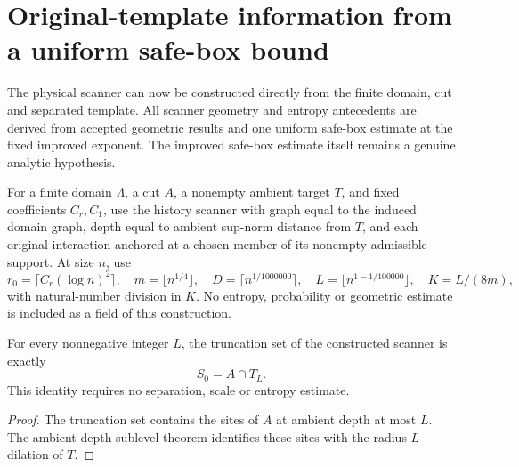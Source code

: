 \section{Original-template information from a uniform safe-box bound}
\label{sec:template-final-information}

The physical scanner can now be constructed directly from the
finite domain, cut and separated template.  All scanner geometry and
entropy antecedents are derived from accepted geometric results and one
uniform safe-box estimate at the fixed improved exponent.  The improved
safe-box estimate itself remains a genuine analytic hypothesis.

\begin{definition}
    \label{def:final-template-scanner}
    \leanok
    For a finite domain $\Lambda$, a cut $A$, a nonempty ambient target $T$,
    and fixed coefficients $C_r,C_1$, use the history
    scanner with graph equal to the induced domain graph, depth equal to
    ambient sup-norm distance from $T$, and each original interaction
    anchored at a chosen member of its nonempty admissible support.
    At size $n$, use
    \[
        r_0=\lceil C_r(\log n)^2\rceil,\quad
        m=\lfloor n^{1/4}\rfloor,\quad
        D=\lceil n^{1/1000000}\rceil,\quad
        L=\lfloor n^{1-1/100000}\rfloor,\quad K=L/(8m),
    \]
    with natural-number division in $K$.  No entropy, probability or
    geometric estimate is included as a field of this construction.
\end{definition}

\begin{lemma}
    \label{thm:final-template-scanner-truncation}
    \leanok
    For every nonnegative integer $L$, the truncation set of the
    constructed scanner is exactly
    \[
        S_0=A\cap T_L.
    \]
    This identity requires no separation, scale or entropy estimate.
\end{lemma}

\begin{proof}
    \leanok
    The truncation set contains the sites of $A$ at ambient depth
    at most $L$.  The ambient-depth sublevel theorem identifies
    these sites with the radius-$L$ dilation of $T$.
\end{proof}

